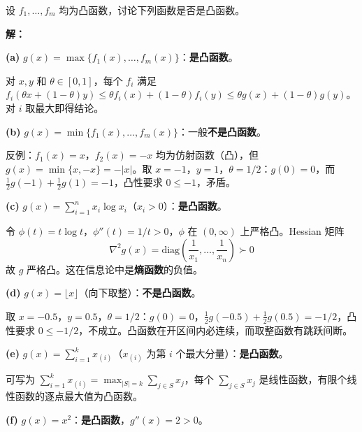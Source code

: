 \begin{example}[函数凸性判断]\label{ex:convex-func-judge}
设 $f_1, \ldots, f_m$ 均为凸函数，讨论下列函数是否是凸函数。

\textbf{解：}

\textbf{(a)} $g(x) = \max\{f_1(x), \ldots, f_m(x)\}$：\textbf{是凸函数}。

对 $x, y$ 和 $\theta \in [0,1]$，每个 $f_i$ 满足 $f_i(\theta x + (1-\theta)y) \leq \theta f_i(x) + (1-\theta) f_i(y) \leq \theta g(x) + (1-\theta) g(y)$。对 $i$ 取最大即得结论。

\textbf{(b)} $g(x) = \min\{f_1(x), \ldots, f_m(x)\}$：一般\textbf{不是凸函数}。

反例：$f_1(x) = x$，$f_2(x) = -x$ 均为仿射函数（凸），但 $g(x) = \min\{x, -x\} = -|x|$。取 $x = -1$，$y = 1$，$\theta = 1/2$：$g(0) = 0$，而 $\frac{1}{2}g(-1) + \frac{1}{2}g(1) = -1$，凸性要求 $0 \leq -1$，矛盾。

\textbf{(c)} $g(x) = \sum_{i=1}^n x_i \log x_i$（$x_i > 0$）：\textbf{是凸函数}。

令 $\phi(t) = t \log t$，$\phi''(t) = 1/t > 0$，$\phi$ 在 $(0, \infty)$ 上严格凸。Hessian 矩阵
\[
\nabla^2 g(x) = \text{diag}\left(\frac{1}{x_1}, \ldots, \frac{1}{x_n}\right) \succ 0
\]
故 $g$ 严格凸。这在信息论中是\textbf{熵函数}的负值。

\textbf{(d)} $g(x) = \lfloor x \rfloor$（向下取整）：\textbf{不是凸函数}。

取 $x = -0.5$，$y = 0.5$，$\theta = 1/2$：$g(0) = 0$，$\frac{1}{2}g(-0.5) + \frac{1}{2}g(0.5) = -1/2$，凸性要求 $0 \leq -1/2$，不成立。凸函数在开区间内必连续，而取整函数有跳跃间断。

\textbf{(e)} $g(x) = \sum_{i=1}^k x_{(i)}$（$x_{(i)}$ 为第 $i$ 个最大分量）：\textbf{是凸函数}。

可写为 $\sum_{i=1}^k x_{(i)} = \max_{|S|=k} \sum_{j \in S} x_j$，每个 $\sum_{j \in S} x_j$ 是线性函数，有限个线性函数的逐点最大值为凸函数。

\textbf{(f)} $g(x) = x^2$：\textbf{是凸函数}，$g''(x) = 2 > 0$。
\end{example}

